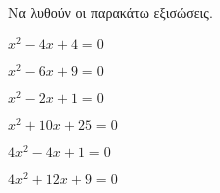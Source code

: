 Να λυθούν οι παρακάτω εξισώσεις.
\begin{multicols}{2}
\begin{alist}
\item $ x^2-4x+4=0 $
\item $ x^2-6x+9=0 $
\item $ x^2-2x+1=0 $
\item $ x^2+10x+25=0 $
\item $ 4x^2-4x+1=0 $
\item $ 4x^2+12x+9=0 $
\end{alist}
\end{multicols}
